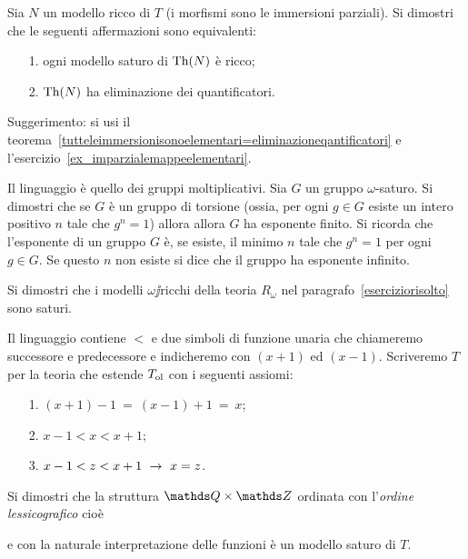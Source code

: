 \begin{exercise}\label{ricchezza_saturazione_EQ}
Sia $N$ un modello ricco di $T$ (i morfismi sono le immersioni parziali). Si dimostri che le seguenti affermazioni sono equivalenti:
\begin{itemize}
\item[1.] ogni modello saturo di $\textrm{Th}(N)$ \`e ricco;
\item[2.] $\textrm{Th}(N)$ ha eliminazione dei quantificatori. 
\end{itemize}
Suggerimento: si usi il teorema~\ref{tutteleimmersionisonoelementari=eliminazioneqantificatori} e l'esercizio~\ref{ex_imparzialemappeelementari}.\QED
\end{exercise}


\begin{exercise}
Il linguaggio \`e quello dei gruppi moltiplicativi. Sia $G$ un gruppo $\omega$-saturo. Si dimostri che se $G$ \`e un gruppo di torsione (ossia, per ogni $g\in G$ esiste un intero positivo $n$ tale che $g^n=1$) allora allora $G$ ha esponente finito. Si ricorda che  l'esponente di un gruppo $G$ \`e, se esiste, il minimo $n$ tale che $g^n=1$ per ogni $g\in G$. Se questo $n$ non esiste si dice che il gruppo ha esponente infinito.\QED 
\end{exercise}


\begin{exercise}\label{ex_oldse+infiniti_colori}
Si dimostri che i modelli $\omega\jj$ricchi della teoria $R_\omega$ nel paragrafo~\ref{eserciziorisolto} sono saturi.\QED
\end{exercise}

\begin{exercise}\label{ex_QQxZZ_saturo}
Il linguaggio contiene $<$ e due simboli di funzione unaria che chiameremo successore e predecessore e indicheremo con $(x+1)$ ed $(x-1)$. Scriveremo $T$ per la teoria che estende $T_{\rm ol}$ con i seguenti assiomi:
\begin{itemize}
\item[1.] $(x+1)-1\ =\ (x-1)+1\ =\ x$;
\item[2.] $x-1<x<x+1$;
\item[3.] $x-1<z<x+1\ \rightarrow\ x=z$.
\end{itemize}
Si dimostri che la struttura $\QQ\times\ZZ$ ordinata con l'\emph{ordine lessicografico\/} cio\`e 


e con la naturale interpretazione delle funzioni \`e un modello saturo di $T$.\QED 
\end{exercise}

